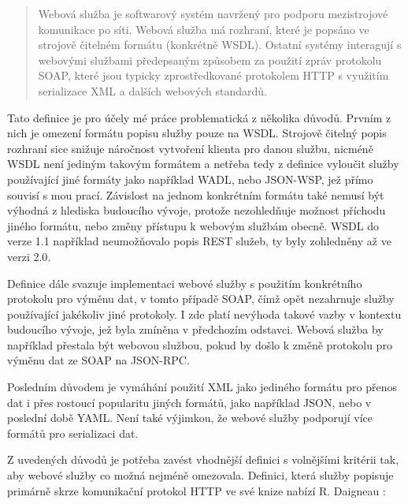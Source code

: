 \documentclass[czech,DP]{thesiskiv}
\begin{document}
\begin{quote}
	Webová služba je softwarový systém navržený pro podporu mezistrojové komunikace po síti. Webová služba má rozhraní, které je popsáno ve strojově čitelném formátu (konkrétně WSDL). Ostatní systémy interagují s webovými službami předepsaným způsobem za použití zpráv protokolu SOAP, které jsou typicky zprostředkované protokolem HTTP s využitím serializace XML a dalších webových standardů.
\end{quote}


Tato definice je pro účely mé práce problematická z několika důvodů. Prvním z nich je omezení formátu popisu služby pouze na WSDL. Strojově čitelný popis rozhraní sice snižuje náročnost vytvoření klienta pro danou službu, nicméně WSDL není jediným takovým formátem a netřeba tedy z definice vyloučit služby používající jiné formáty jako například WADL, nebo JSON-WSP, jež přímo souvisí s mou prací. Závislost na jednom konkrétním formátu také nemusí být výhodná z hlediska budoucího vývoje, protože nezohledňuje možnost příchodu jiného formátu, nebo změny přístupu k webovým službám obecně. WSDL do verze 1.1 například neumožňovalo popis REST služeb, ty byly zohledněny až ve verzi 2.0\cite{restWsdl}.  

Definice dále svazuje implementaci webové služby s použitím konkrétního protokolu pro výměnu dat, v tomto případě SOAP, čímž opět nezahrnuje služby používající jakékoliv jiné protokoly. I zde platí nevýhoda takové vazby v kontextu budoucího vývoje, jež byla zmíněna v předchozím odstavci. Webová služba by například přestala být webovou službou, pokud by došlo k změně protokolu pro výměnu dat ze SOAP na JSON-RPC.

Posledním důvodem je vymáhání použití XML jako jediného formátu pro přenos dat i přes rostoucí popularitu jiných formátů, jako například JSON, nebo v poslední době YAML. Není také výjimkou, že webové služby podporují více formátů pro serializaci dat. 

Z uvedených důvodů je potřeba zavést vhodnější definici s volnějšími kritérii tak, aby webové služby co možná nejméně omezovala. Definici, která služby popisuje primárně skrze komunikační protokol HTTP ve své knize nabízí R. Daigneau \cite{fromObjectsToWs}: 
\end{document}
